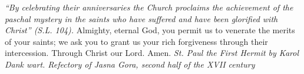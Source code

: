 \pagestyle{empty}
\hspace{0pt}
\vfill

\textit{``By celebrating their anniversaries the Church proclaims the
achievement of the paschal mystery in the saints who have suffered
and have been glorified with Christ'' (S.L. 104).}
\medbreak
Almighty, eternal God, you permit us to venerate the merits of your
saints; we ask you to grant us your rich forgiveness through their
intercession. Through Christ our Lord. Amen.
\vfill
\textit{St. Paul the First Hermit by Karol Dank wart. Refectory of Jasna
Gora, second half of the XVII century}
\hspace{0pt}
\newpage

